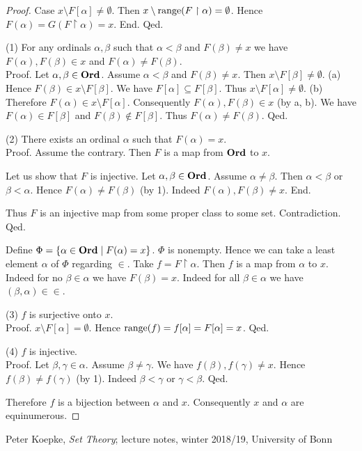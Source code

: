 \documentclass{article}
\begin{document}
\begin{forthel}
\begin{proof}
        Case $x \setminus F[\alpha] \neq \emptyset$.
          Then $x \setminus \textrm{range}(F \restriction \alpha) = \emptyset$.
          Hence $F(\alpha)
            = G(F \restriction \alpha)
            = x$.
        End.
      Qed.

      (1) For any ordinals $\alpha, \beta$ such that $\alpha < \beta$ and
      $F(\beta) \neq x$ we have $F(\alpha), F(\beta) \in x$ and $F(\alpha) \neq
      F(\beta)$. \\
      Proof.
        Let $\alpha, \beta \in \textbf{Ord}$.
        Assume $\alpha < \beta$ and $F(\beta) \neq x$.
        Then $x \setminus F[\beta] \neq \emptyset$.
        (a) Hence $F(\beta) \in x \setminus F[\beta]$.
        We have $F[\alpha] \subseteq F[\beta]$.
        Thus $x \setminus F[\alpha] \neq \emptyset$.
        (b) Therefore $F(\alpha) \in x \setminus F[\alpha]$.
        Consequently $F(\alpha), F(\beta) \in x$ (by a, b).
        We have $F(\alpha) \in F[\beta]$ and $F(\beta) \notin F[\beta]$.
        Thus $F(\alpha) \neq F(\beta)$.
      Qed.

      (2) There exists an ordinal $\alpha$ such that $F(\alpha) = x$. \\
      Proof.
        Assume the contrary.
        Then $F$ is a map from $\textbf{Ord}$ to $x$.

        Let us show that $F$ is injective.
          Let $\alpha, \beta \in \textbf{Ord}$.
          Assume $\alpha \neq \beta$.
          Then $\alpha < \beta$ or $\beta < \alpha$.
          Hence $F(\alpha) \neq F(\beta)$ (by 1).
          Indeed $F(\alpha), F(\beta) \neq x$.
        End.

        Thus $F$ is an injective map from some proper class to some set.
        Contradiction.
      Qed.

      Define $\Phi = \{ \alpha \in \textbf{Ord} \mid F(\alpha) = x \}$.
      $\Phi$ is nonempty.
      Hence we can take a least element $\alpha$ of $\Phi$ regarding ${\in}$.
      Take $f = F \restriction \alpha$.
      Then $f$ is a map from $\alpha$ to $x$.
      Indeed for no $\beta \in \alpha$ we have $F(\beta) = x$.
      Indeed for all $\beta \in \alpha$ we have $(\beta, \alpha) \in {\in}$.

      (3) $f$ is surjective onto $x$. \\
      Proof.
        $x \setminus F[\alpha] = \emptyset$.
        Hence $\textrm{range}(f)
          = f[\alpha]
          = F[\alpha]
          = x$.
      Qed.

      (4) $f$ is injective. \\
      Proof.
        Let $\beta, \gamma \in \alpha$.
        Assume $\beta \neq \gamma$.
        We have $f(\beta), f(\gamma) \neq x$.
        Hence $f(\beta) \neq f(\gamma)$ (by 1).
        Indeed $\beta < \gamma$ or $\gamma < \beta$.
      Qed.

      Therefore $f$ is a bijection between $\alpha$ and $x$.
      Consequently $x$ and $\alpha$ are equinumerous.
    \end{proof}
  \end{forthel}

  \begin{thebibliography}{1}
     Peter Koepke,
    \textit{Set Theory};
    lecture notes,
    winter 2018/19,
    University of Bonn
  \end{thebibliography}
\end{document}
